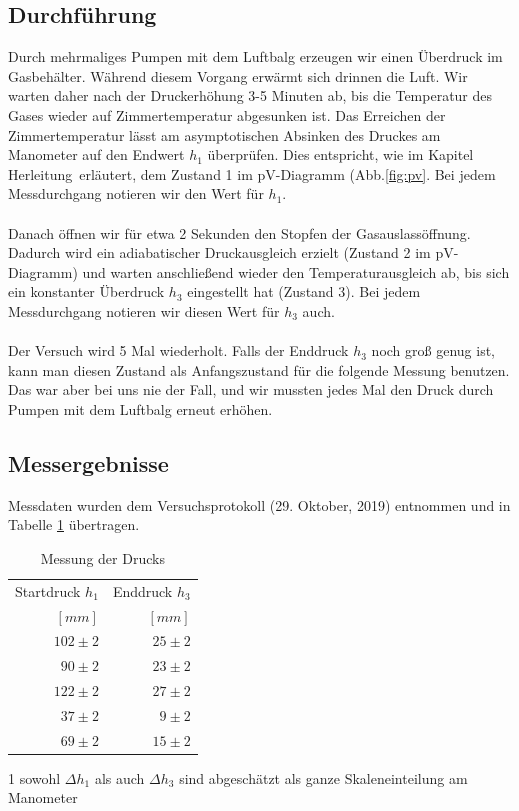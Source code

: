 \documentclass[a4paper,10pt]{article}
\begin{document}
\subsection[Durchführung]{Durchführung\fnrefb}
Durch mehrmaliges Pumpen mit dem Luftbalg erzeugen wir einen Überdruck im Gasbehälter. Während diesem Vorgang erwärmt sich drinnen die Luft. Wir warten daher nach der Druckerhöhung 3-5 Minuten ab, bis die Temperatur des Gases wieder auf Zimmertemperatur abgesunken ist. Das Erreichen der Zimmertemperatur lässt am asymptotischen Absinken des Druckes am
Manometer auf den Endwert \(h_1\) überprüfen. Dies entspricht, wie im Kapitel \glqq Herleitung\grqq~erläutert, dem Zustand 1 im pV-Diagramm (Abb.\ref{fig:pv}. Bei jedem Messdurchgang notieren wir den Wert für \(h_1\).\\\\
Danach öffnen wir für etwa 2 Sekunden den Stopfen der Gasauslassöffnung. Dadurch wird ein adiabatischer Druckausgleich erzielt (Zustand 2 im pV-Diagramm) und warten anschließend wieder den Temperaturausgleich ab, bis sich ein konstanter Überdruck \(h_3\) eingestellt hat (Zustand 3). Bei jedem Messdurchgang notieren wir diesen Wert für \(h_3\) auch.\\\\
Der Versuch wird 5 Mal wiederholt. Falls der Enddruck \(h_3\) 
noch groß genug ist, kann man diesen Zustand als Anfangszustand für
die folgende Messung benutzen. Das war aber bei uns nie der Fall, und wir mussten jedes Mal den Druck durch Pumpen mit dem Luftbalg erneut erhöhen.

\subsection{Messergebnisse}
Messdaten wurden dem Versuchsprotokoll (29. Oktober, 2019) entnommen und in Tabelle \ref{tab:Tab1} übertragen.
\unboldmath
\begin{table}[htb]
\centering
\caption{Messung der Drucks}\label{tab:Tab1}
\begin{threeparttable}
\begin{tabular}{rr}
\toprule
Startdruck \boldmath\(h_1\)\unboldmath & Enddruck \boldmath\(h_3\)\unboldmath \\
\([mm]\)&\([mm]\)\\
\midrule
\(102\pm2\)&\(25\pm2\)\\
\(90\pm2\)&\(23\pm2\)\\
\(122\pm2\)&\(27\pm2\)\\
\(37\pm2\)&\(9\pm2\)\\
\(69\pm2\)&\(15\pm2\)\\
  \bottomrule
 \end{tabular}
\begin{tablenotes}
\raggedright
\item[1]sowohl \boldmath\(\Delta h_1\) als auch \(\Delta h_3 \) sind abgeschätzt als ganze Skaleneinteilung am Manometer\unboldmath
\end{tablenotes}
\end{threeparttable}\end{table}
\boldmath
\end{document}
